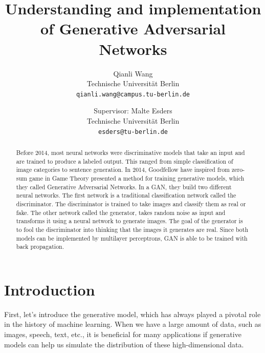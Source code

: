 \documentclass[10pt,twocolumn,letterpaper]{article}
\begin{document}
\title{Understanding and implementation of Generative Adversarial Networks}

\author{Qianli Wang\\
Technische Universität Berlin\\
{\tt\small qianli.wang@campus.tu-berlin.de}
\and
Supervisor: Malte Esders\\
Technische Universität Berlin\\
{\tt\small esders@tu-berlin.de}
}

\maketitle

\begin{abstract}
    Before 2014, most neural networks were discriminative models that take an input and are trained to produce a labeled output. This ranged from simple classification of image categories to sentence generation. In 2014, Goodfellow \etal \cite{goodfellow2014generative} have inspired from zero-sum game\cite{Bacharach1991} in Game Theory presented a method for training generative models, which they called Generative Adversarial Networks. In a GAN, they build two different neural networks. The first network is a traditional classification network called the discriminator. The discriminator is trained to take images and classify them as real or fake. The other network called the generator, takes random noise as input and transforms it using a neural network to generate images. The goal of the generator is to fool the discriminator into thinking that the images it generates are real. Since both models can be implemented by multilayer perceptrons, GAN is able to be trained with back propagation\cite{hecht1992theory}.
\end{abstract}

\section{Introduction}
First, let's introduce the generative model, which has always played a pivotal role in the history of machine learning. When we have a large amount of data, such as images, speech, text, etc., it is beneficial for many applications if generative models can help us simulate the distribution of these high-dimensional data.
\end{document}
